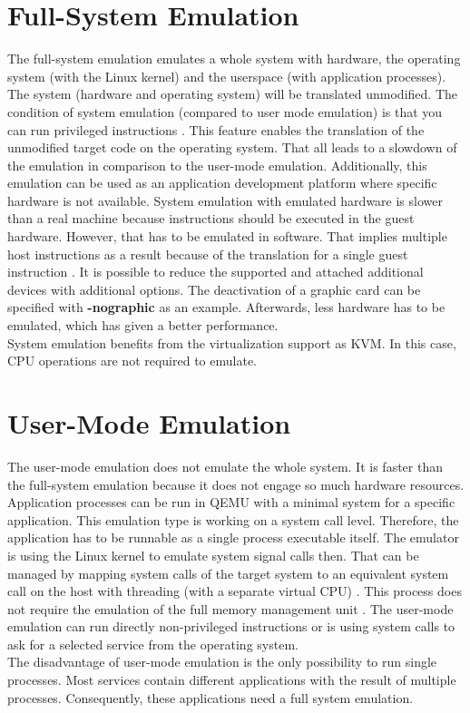 \section{Full-System Emulation}

The full-system emulation emulates a whole system with hardware, the operating system (with the Linux kernel) and the userspace (with application processes). 
The system (hardware and operating system) will be translated unmodified. The condition of system emulation (compared to user mode emulation) is that you can run privileged instructions \cite[~p.2]{Butt2011}. This feature enables the translation of the unmodified target code on the operating system.
That all leads to a slowdown of the emulation in comparison to the user-mode emulation.
Additionally, this emulation can be used as an application development platform where specific hardware is not available. 
System emulation with emulated hardware is slower than a real machine because instructions should be executed in the guest hardware.  However, that has to be emulated in software. 
That implies multiple host instructions as a result because of the translation for a single guest instruction \cite[~p.1]{Tong2014}.
It is possible to reduce the supported and attached additional devices with additional options. The deactivation of a graphic card can be specified with \textbf{-nographic} as an example. Afterwards, less hardware has to be emulated, which has given a better performance.  \\
System emulation benefits from the virtualization support as KVM. In this case, CPU operations are not required to emulate.

\section{User-Mode Emulation}

The user-mode emulation does not emulate the whole system. It is faster than the full-system emulation because it does not engage so much hardware resources. Application processes can be run in QEMU with a minimal system for a specific application. 
This emulation type is working on a system call level. Therefore, the application has to be runnable as a single process executable itself. The emulator is using the Linux kernel to emulate system signal calls then. That can be managed by mapping system calls of the target system to an equivalent system call on the host with threading (with a separate virtual CPU) \cite{QEMU}. This process does not require the emulation of the full  memory  management  unit \cite[~p.2]{Butt2011}.
The user-mode emulation can run directly non-privileged instructions or is using system calls to ask for a selected service from the operating system. \\
The disadvantage of user-mode emulation is the only possibility to run single processes. Most services contain different applications with the result of multiple processes. Consequently, these applications need a full system emulation.


